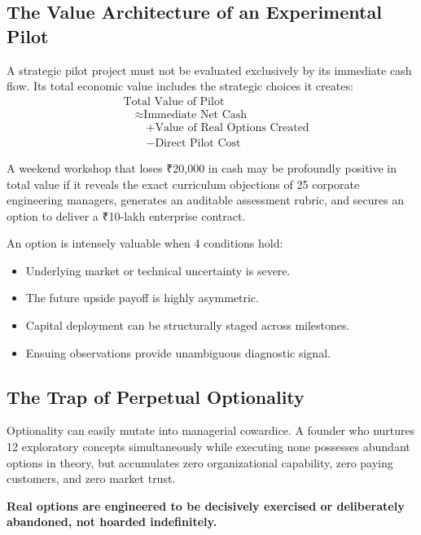 \subsection{The Value Architecture of an Experimental Pilot}

A strategic pilot project must not be evaluated exclusively by its immediate cash flow. Its total economic value includes the strategic choices it creates:
\begin{equation}
\begin{aligned}
&\text{Total Value of Pilot} \\
&\quad \approx \text{Immediate Net Cash} \\
&\qquad + \text{Value of Real Options Created} \\
&\qquad - \text{Direct Pilot Cost}
\end{aligned}
\end{equation}

A weekend workshop that loses ₹20,000 in cash may be profoundly positive in total value if it reveals the exact curriculum objections of 25 corporate engineering managers, generates an auditable assessment rubric, and secures an option to deliver a ₹10-lakh enterprise contract.

An option is intensely valuable when 4 conditions hold:
\begin{itemize}[leftmargin=10pt,itemsep=1pt,topsep=1pt]
  \item Underlying market or technical uncertainty is severe.
  \item The future upside payoff is highly asymmetric.
  \item Capital deployment can be structurally staged across milestones.
  \item Ensuing observations provide unambiguous diagnostic signal.
\end{itemize}

\subsection{The Trap of Perpetual Optionality}

Optionality can easily mutate into managerial cowardice. A founder who nurtures 12 exploratory concepts simultaneously while executing none possesses abundant options in theory, but accumulates zero organizational capability, zero paying customers, and zero market trust.

\textbf{Real options are engineered to be decisively exercised or deliberately abandoned, not hoarded indefinitely.}

